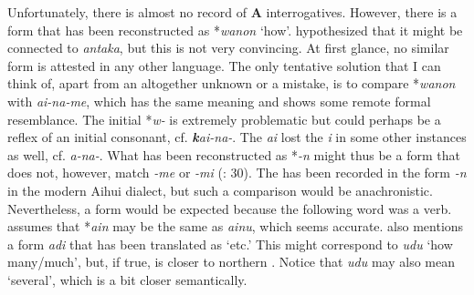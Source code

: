 Unfortunately, there is almost no record of \textbf{ A} interrogatives. However, there is a form that has been reconstructed as *\textit{wanon}  ‘how’. \citet[137]{Kiyose1977} hypothesized that it might be connected to  \textit{antaka}, but this is not very convincing. At first glance, no similar  form is attested in any other  language. The only tentative solution that I can think of, apart from an altogether unknown  or a mistake, is to compare *\textit{wanon} with  \textit{ai-na-me}, which has the same meaning and shows some remote formal resemblance. The initial *\textit{w-} is extremely problematic but could perhaps be a reflex of an initial consonant, cf.  \textbf{\textit{k}}\textit{ai-na-}. The  \textit{ai} lost the \textit{i} in some other instances as well, cf.  \textit{a-na-}. What has been reconstructed as *\textit{-n} might thus be a  form that does not, however, match  \textit{-me} or  \textit{-mi} (\citealt{MuYejun1987}: 30). The  has been recorded in the form \textit{-n} in the modern Aihui dialect, but such a comparison would be anachronistic. Nevertheless, a  form would be expected because the following word was a verb. \citet[140]{Kiyose1977} assumes that *\textit{ain}  may be the same  as  \textit{ainu}, which seems accurate. \citet[144]{Kiyose1977} also mentions a form \textit{adi}  that has been translated as ‘etc.’ This might correspond to  \textit{udu} ‘how many/much’, but, if true, is closer to northern . Notice that  \textit{udu} may also mean ‘several’, which is a bit closer semantically.

